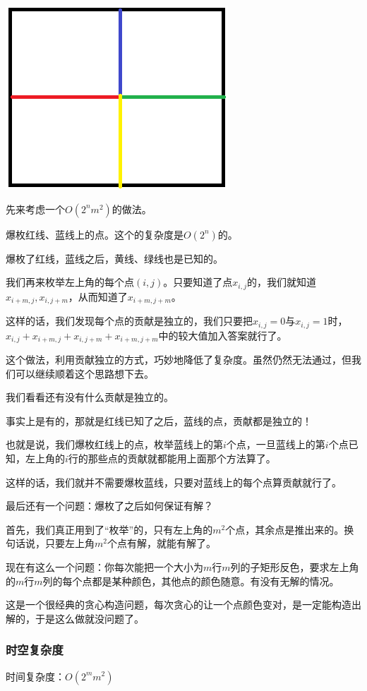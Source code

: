 \documentclass{ctexart}
\begin{document}
\includegraphics{ceil.png}

先来考虑一个$O(2^nm^2)$的做法。

爆枚红线、蓝线上的点。这个的复杂度是$O(2^n)$的。

爆枚了红线，蓝线之后，黄线、绿线也是已知的。

我们再来枚举左上角的每个点$(i,j)$。只要知道了点$x_{i,j}$的，我们就知道$x_{i+m,j},x_{i,j+m}$，从而知道了$x_{i+m,j+m}$。

这样的话，我们发现每个点的贡献是独立的，我们只要把$x_{i,j}=0$与$x_{i,j}=1$时，$x_{i,j}+x_{i+m,j}+x_{i,j+m}+x_{i+m,j+m}$中的较大值加入答案就行了。

这个做法，利用贡献独立的方式，巧妙地降低了复杂度。虽然仍然无法通过，但我们可以继续顺着这个思路想下去。

我们看看还有没有什么贡献是独立的。

事实上是有的，那就是红线已知了之后，蓝线的点，贡献都是独立的！

也就是说，我们爆枚红线上的点，枚举蓝线上的第$i$个点，一旦蓝线上的第$i$个点已知，左上角的$i$行的那些点的贡献就都能用上面那个方法算了。

这样的话，我们就并不需要爆枚蓝线，只要对蓝线上的每个点算贡献就行了。

最后还有一个问题：爆枚了之后如何保证有解？

首先，我们真正用到了“枚举”的，只有左上角的$m^2$个点，其余点是推出来的。换句话说，只要左上角$m^2$个点有解，就能有解了。

现在有这么一个问题：你每次能把一个大小为$m$行$m$列的子矩形反色，要求左上角的$m$行$m$列的每个点都是某种颜色，其他点的颜色随意。有没有无解的情况。

这是一个很经典的贪心构造问题，每次贪心的让一个点颜色变对，是一定能构造出解的，于是这么做就没问题了。
\subsubsection{时空复杂度}
时间复杂度：$O(2^m m^2)$
\end{document}
